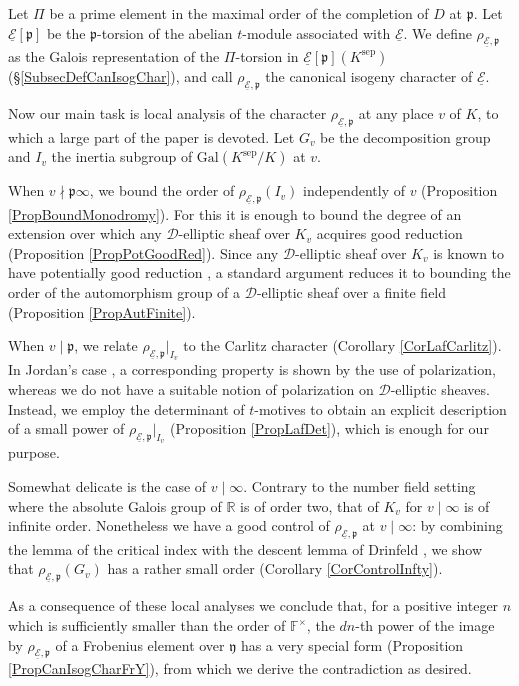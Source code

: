 \documentclass[10pt]{amsart}
\theoremstyle{plain}
\theoremstyle{definition}
\newcommand{\Gal}{\mathrm{Gal}}
\newcommand{\sep}{\mathrm{sep}}
\newcommand{\ucE}{\underline{\mathcal{E}}}
\newcommand{\bF}{\mathbb{F}}
\newcommand{\bR}{\mathbb{R}}
\newcommand{\sD}{\mathscr{D}}
\newcommand{\frp}{\mathfrak{p}}
\newcommand{\fry}{\mathfrak{y}}
\begin{document}
Let $\Pi$ be a prime element in the maximal order of the completion of $D$ at 
$\frp$. 
Let $\ucE[\frp]$ be the $\frp$-torsion of the 
abelian $t$-module 
associated with
$\ucE$.
We define $\rho_{\ucE,\frp}$ as the Galois 
representation of the $\Pi$-torsion in $\ucE[\frp](K^\sep)$  
(\S\ref{SubsecDefCanIsogChar}),
and call $\rho_{\ucE,\frp}$ the 
canonical isogeny character of $\ucE$. 

Now our main task is local analysis of the character $\rho_{\ucE,\frp}$ at any place $v$ of $K$, 
to which a large part of the paper is devoted. Let $G_v$ be the decomposition group and 
$I_v$ the inertia subgroup of $\Gal(K^\sep/K)$ at $v$.


When $v\nmid \frp\infty$, we bound the order of 
$\rho_{\ucE,\frp}(I_v)$ independently of $v$
(Proposition \ref{PropBoundMonodromy}). 
For this it is enough to bound
the degree of an extension over which any $\sD$-elliptic sheaf over $K_v$ 
acquires good reduction (Proposition \ref{PropPotGoodRed}).
Since any $\sD$-elliptic sheaf over $K_v$ is known to have potentially good 
reduction \cite{LRS,Hau}, a standard 
argument reduces it to bounding the order of the automorphism group of 
a $\sD$-elliptic sheaf over a finite field (Proposition \ref{PropAutFinite}).

When $v\mid \frp$, we relate $\rho_{\ucE,\frp}|_{I_v}$ to the Carlitz character 
(Corollary \ref{CorLafCarlitz}).
In Jordan's case \cite{Jordan}, a corresponding property is shown by the use of 
polarization, whereas we do not have a suitable notion of polarization on 
$\sD$-elliptic sheaves.
Instead, we employ the determinant of $t$-motives to obtain an explicit 
description of a small power of $\rho_{\ucE,\frp}|_{I_v}$ (Proposition 
\ref{PropLafDet}),
which is enough for our purpose.

Somewhat delicate is the case of $v\mid \infty$. Contrary to the number field 
setting where the absolute Galois group of $\bR$ is of order two,
that of $K_v$ for $v\mid\infty$ is of infinite order. 
Nonetheless 
we have a good control of $\rho_{\ucE,\frp}$ at 
$v\mid\infty$: 
by combining the lemma of the critical index \cite[Lemma 3.3.1]{BS} with 
the descent lemma of Drinfeld 
\cite[Proposition 1.1]{Dri_F}, we show that $\rho_{\ucE,\frp}(G_v)$ has a 
rather small 
order (Corollary \ref{CorControlInfty}).

As a consequence of these local analyses we conclude 
that, for a positive integer $n$ which is sufficiently smaller than the order of $\bF^\times$, 
the $d n$-th power of the image by 
$\rho_{\ucE,\frp}$ of a Frobenius element over $\fry$ has a very special form
(Proposition \ref{PropCanIsogCharFrY}), from which we derive the contradiction as desired.
\end{document}
